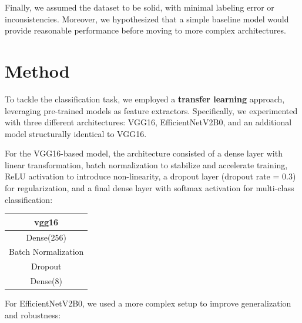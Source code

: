 \documentclass[11pt]{article}
\begin{document}
\begin{multicols*}{2}
        Finally, we assumed the dataset to be solid, with minimal labeling error or inconsistencies. Moreover, we hypothesized that a simple baseline model would provide reasonable performance before moving to more complex architectures. 



        \section{Method}
        
        To tackle the classification task, we employed a \textbf{transfer learning} approach, leveraging pre-trained models as feature extractors. Specifically, we experimented with three different architectures: VGG16, EfficientNetV2B0, and an additional model structurally identical to VGG16.
        
        For the VGG16-based model, the architecture consisted of a dense layer with linear transformation, batch normalization to stabilize and accelerate training, ReLU activation to introduce non-linearity, a dropout layer (dropout rate = 0.3) for regularization, and a final dense layer with softmax activation for multi-class classification:

        \begin{center}
        \begin{tabular}{c}
        \toprule
        vgg16\\
        \hline
        Dense(256)\\
        Batch Normalization\\
        Dropout\\
        Dense(8)\\
        \bottomrule
        \end{tabular}
        \end{center}

        For EfficientNetV2B0, we used a more complex setup to improve generalization and robustness:


\end{multicols*}
\end{document}
